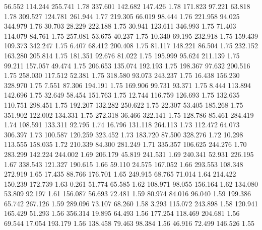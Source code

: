   56.552  114.244  255.741         1.78
 337.601  142.682  147.426         1.78
 171.823   97.221   63.818         1.78
 309.527  124.781  261.944         1.77
 219.305   66.019   98.444         1.76
 221.958   94.025  344.979         1.76
  30.703   28.229  222.188         1.75
  30.941  123.611  346.993         1.75
  71.403  114.079   84.761         1.75
 257.081   53.675   40.237         1.75
  10.340   69.195  232.918         1.75
 159.439  109.373  342.247         1.75
   6.407   68.412  200.408         1.75
  81.117  148.221   86.504         1.75
 232.152  163.280  205.814         1.75
 181.351   92.676   81.022         1.75
 195.999   95.624  211.139         1.75
  99.211  157.057   49.474         1.75
 206.653  135.074  192.193         1.75
 198.367   97.632  200.516         1.75
 258.030  117.512   52.381         1.75
 318.580   93.073  243.237         1.75
  16.438  156.230  328.970         1.75
   7.551   87.306  194.191         1.75
 169.906   99.731   93.371         1.75
   8.444  113.894  142.696         1.75
  32.649   58.454  151.763         1.75
  12.744  116.759  126.693         1.75
 132.635  110.751  298.451         1.75
 192.207  132.282  250.622         1.75
  22.307   53.405  185.268         1.75
 351.902  122.002  134.331         1.75
 272.318   36.466  322.141         1.75
 128.786   85.461  284.419         1.74
 108.591  133.311   92.795         1.74
  16.796  131.118  264.113         1.73
 112.472   64.073  306.397         1.73
 100.587  120.259  323.452         1.73
 183.720   87.500  328.276         1.72
  10.298  113.555  158.035         1.72
 210.339   84.300  281.249         1.71
 335.357  106.625  244.276         1.70
 283.299  142.224  244.002         1.69
 206.179   45.819  241.531         1.69
 240.341   52.931  226.195         1.67
 338.543  121.327  190.615         1.66
  59.110   24.575  167.052         1.66
 293.553  108.348  272.919         1.65
  17.435   88.766  176.701         1.65
 249.915   68.765   71.014         1.64
 214.422  150.239  172.739         1.63
   0.261   51.774   65.585         1.62
 108.971   98.055  156.164         1.62
 134.080   53.809   92.197         1.61
 156.087   56.693   72.481         1.59
  80.974   84.016   96.040         1.59
 199.386   65.742  267.126         1.59
 289.096   73.107   68.260         1.58
   3.293  115.072  243.898         1.58
 120.941  165.429   51.293         1.56
 356.314   19.895   64.493         1.56
 177.254  118.469  204.681         1.56
  69.544   17.054  193.179         1.56
 138.458   79.463   98.384         1.56
  46.916   72.499  146.526         1.55

